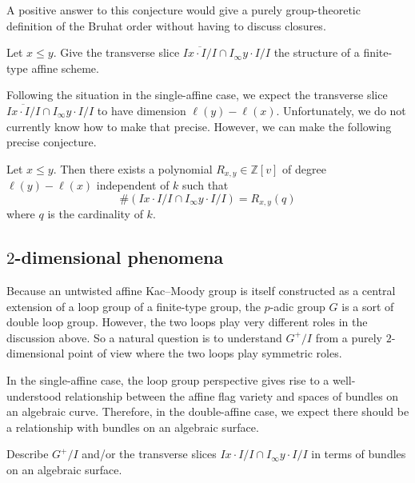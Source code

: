 \documentclass[ALCO,ThmDefs,Unicode]{cedram}
\newcommand{\ZZ}{\mathbb{Z}}
\begin{document}
A positive answer to this conjecture would give a purely group-theoretic definition of the Bruhat order without having to discuss closures.

\begin{ques}
Let $x \leq y$. Give the transverse slice $\overline{I x \cdot I/I} \cap I_\infty y \cdot I/I$ the structure of a finite-type affine scheme.
\end{ques}

Following the situation in the single-affine case, we expect the transverse slice $\overline{I x \cdot I/I} \cap I_\infty y \cdot I/I$ to have dimension $\ell(y) - \ell(x)$. Unfortunately, we do not currently know how to make that precise. However, we can make the following precise conjecture.

\begin{conj}
Let $x \leq y$. Then there exists a polynomial $R_{x,y} \in \ZZ[v]$ of degree $\ell(y) - \ell(x)$ independent of $k$ such that
\begin{equation}\label{eq:29}
\# (I x \cdot I/I \cap I_\infty y \cdot I/I) = R_{x,y}(q)
\end{equation}
where $q$ is the cardinality of $k$.
\end{conj}

\subsection{\texorpdfstring{$2$}{2}-dimensional phenomena}

Because an untwisted affine Kac--Moody group is itself constructed as a central extension of a loop group of a finite-type group, the $p$-adic group $G$ is a sort of double loop group. However, the two loops play very different roles in the discussion above. So a natural question is to understand $G^+/I$ from a purely $2$-dimensional point of view where the two loops play symmetric roles.

In the single-affine case, the loop group perspective gives rise to a well-understood relationship between the affine flag variety and spaces of bundles on an algebraic curve. Therefore, in the double-affine case, we expect there should be a relationship with bundles on an algebraic surface.

\begin{ques}
Describe $G^+/I$ and/or the transverse slices $I x \cdot I/I \cap I_\infty y \cdot I/I$ in terms of bundles on an algebraic surface.
\end{ques}
\end{document}
